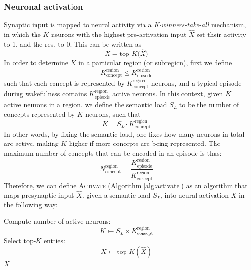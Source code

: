 \documentclass{article}
\begin{document}
\subsubsection*{Neuronal activation}
Synaptic input is mapped to neural activity via a \textit{K-winners-take-all} mechanism, in which the $K$ neurons with the highest pre-activation input $\hat{X}$ set their activity to 1, and the rest to 0. This can be written as
\begin{equation}
    X = \textrm{top-}K\big(\hat{X}\big)
\end{equation}
In  order to determine $K$ in a particular region (or subregion), first we define
\begin{equation}
    K^\textrm{region}_\textrm{concept} \leq K^\textrm{region}_\textrm{episode}
\end{equation}
 such that each concept is represented by $K^\textrm{region}_\textrm{concept}$ neurons, and a typical episode during wakefulness contains $K^\textrm{region}_\textrm{episode}$ active neurons. In this context, given $K$ active neurons in a region, we define the semantic load $S_L$ to be the number of concepts represented by $K$ neurons, such that
 \begin{equation}
     K = S_L \cdot K^\textrm{region}_\textrm{concept}
     \label{eq:semantic_load}
 \end{equation}
In other words, by fixing the semantic load, one fixes how many neurons in total are active, making $K$ higher if more concepts are being represented. The maximum number of concepts that can be encoded in an episode is thus:
 \begin{equation}
     N^\textrm{region}_\textrm{concept} = \frac{K^\textrm{region}_\textrm{episode}}{K^\textrm{region}_\textrm{concept}}
 \end{equation}
 Therefore, we can define \textsc{Activate} (Algorithm \ref{alg:activate}) as an algorithm that maps presynaptic input $\hat{X}$, given a semantic load $S_L$, into neural activation $X$ in the following way:
\begin{algorithm}[h!]
\caption{Neuronal Activation}\label{alg:activate}
\begin{algorithmic}[1]
    \State Compute number of active neurons:
        \[
            K \gets S_L \times K^\textrm{region}_\textrm{concept}
        \]
    \State Select top-$K$ entries:
        \[
            X \gets \textrm{top-}K(\hat{X})
        \]
    \State \Return $X$
\EndFunction
\end{algorithmic}
\end{algorithm}
\end{document}
